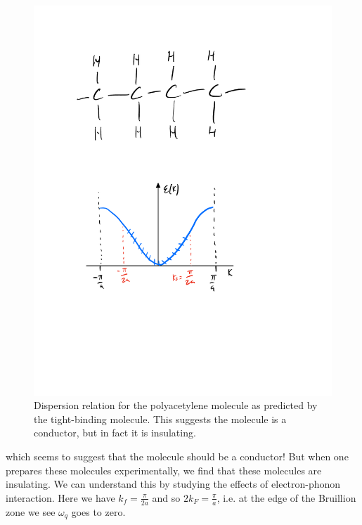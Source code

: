 \begin{figure}[htbp]
    \centering
    \includegraphics[scale=0.6]{Images/fig-polyacetightbinddispersion.pdf}
    \caption{Dispersion relation for the polyacetylene molecule as predicted by the tight-binding molecule. This suggests the molecule is a conductor, but in fact it is insulating.}
    \label{fig-polyacetightbinddispersion}
\end{figure}
which seems to suggest that the molecule should be a conductor! But when one prepares these molecules experimentally, we find that these molecules are insulating. We can understand this by studying the effects of electron-phonon interaction. Here we have $k_f = \frac{\pi}{2a}$ and so $2k_F = \frac{\pi}{a}$, i.e. at the edge of the Bruillion zone we see $\omega_q$ goes to zero.

